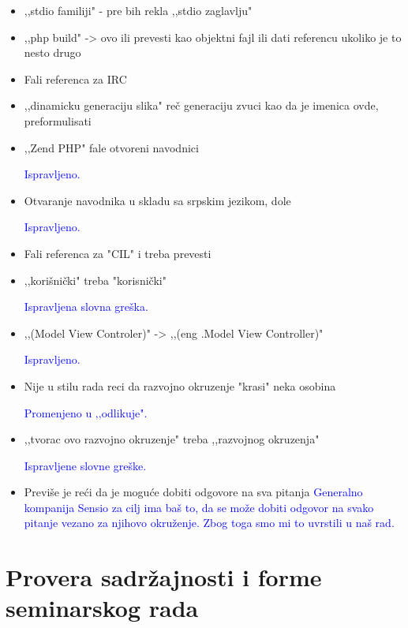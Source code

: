\documentclass[a4paper]{report}
\newcommand{\odgovor}[1]{\textcolor{blue}{#1}}
\begin{document}
\begin{itemize}
\odgovor{}

\item ,,stdio familiji" - pre bih rekla ,,stdio zaglavlju"

\odgovor{}

\item ,,php build" -> ovo ili prevesti kao objektni fajl ili dati referencu ukoliko je to nesto drugo
\item Fali referenca za IRC
\item ,,dinamicku generaciju slika" reč generaciju zvuci kao da je imenica ovde, preformulisati

\item ,,Zend PHP" fale otvoreni navodnici

\odgovor{Ispravljeno.}

\item Otvaranje navodnika u skladu sa srpskim jezikom, dole

\odgovor{Ispravljeno.}

\item Fali referenca za "CIL" i treba prevesti

\item ,,korišnički" treba "korisnički"

\odgovor{Ispravljena slovna greška.}

\item ,,(Model View Controler)" -> ,,(eng .Model View Controller)"

\odgovor{Ispravljeno.}

\item Nije u stilu rada reci da razvojno okruzenje "krasi" neka osobina

\odgovor{Promenjeno u ‚‚odlikuje".}

\item ,,tvorac ovo razvojno okruzenje" treba ,,razvojnog okruzenja"

\odgovor{Ispravljene slovne greške.}

\item Previše je reći da je moguće dobiti odgovore na sva pitanja
\odgovor{Generalno kompanija Sensio za cilj ima baš to, da se može dobiti odgovor na svako pitanje vezano za njihovo okruženje.
Zbog toga smo mi to uvrstili u naš rad.}

\end{itemize}


\section{Provera sadržajnosti i forme seminarskog rada}
\end{document}
